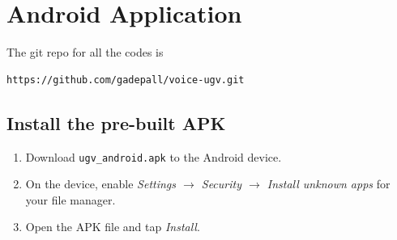 \documentclass[conference]{IEEEtran}
\begin{document}
	
	
	
	
	\appendices
	\section{Android Application} \label{app:android}
	The git repo for all the codes is 
\begin{lstlisting}[language=bash]
https://github.com/gadepall/voice-ugv.git
\end{lstlisting}
	
	\subsection{Install the pre-built APK}
	\begin{enumerate}
		\item Download \texttt{ugv\_android.apk} to the Android device.
		\item On the device, enable \textit{Settings $\to$ Security $\to$
			Install unknown apps} for your file manager.
		\item Open the APK file and tap \textit{Install}.
	\end{enumerate}
	
\end{document}

